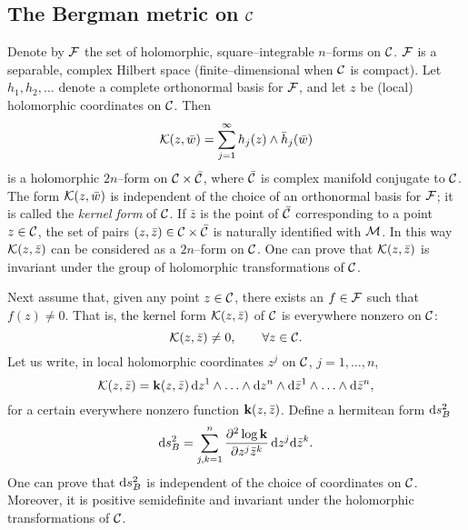 \documentclass[a4paper,a4paper]{article}
\begin{document}
\subsection{The Bergman metric on ${\cal C}$}\label{bemet}


Denote by ${\cal F}$ the set of holomorphic, square--integrable $n$--forms on ${\cal C}$.
${\cal F}$ is a separable, complex Hilbert space (finite--dimensional when ${\cal C}$ is compact).
Let $h_1, h_2, \ldots $ denote a complete orthonormal basis for ${\cal F}$, and let $z$ be (local) 
holomorphic coordinates on ${\cal C}$. Then
\begin{equation}
{\cal K}(z, \bar w)=\sum_{j=1}^{\infty}h_j(z)\wedge\bar h_j(\bar w)
\label{kaka}
\end{equation}
is a holomorphic $2n$--form on ${\cal C}\times\bar {\cal C}$, where $\bar {\cal C}$
is complex manifold conjugate to ${\cal C}$. The form ${\cal K}(z,\bar w)$ is 
independent of the choice of an orthonormal basis for ${\cal F}$; it is called 
the {\it kernel form}\/ of ${\cal C}$. If $\bar z$ is the point of $\bar {\cal C}$ 
corresponding to a point $z\in{\cal C}$, the set of pairs $(z,\bar 
z)\in {\cal C}\times \bar {\cal C}$ is naturally identified with ${\cal 
M}$. In this way ${\cal K}(z, \bar z)$ can be considered as a $2n$--form on 
${\cal C}$. One can prove that ${\cal K}(z, \bar z)$ is invariant under the group 
of holomorphic transformations of ${\cal C}$.

Next assume that, given any point $z\in{\cal C}$, there exists an 
$f\in{\cal F}$ such that $f(z)\neq 0$. That is, the kernel form 
${\cal K}(z,\bar z)$ of ${\cal C}$ is everywhere nonzero on ${\cal C}$:
\begin{equation}
{\cal K}(z,\bar z)\neq 0,\qquad \forall z\in{\cal C}.
\label{knz}
\end{equation}
Let us write, in local holomorphic coordinates $z^j$ on ${\cal C}$,  $j=1,\ldots, n$,
\begin{equation}
{\cal K}(z,\bar z)={\bf k}(z, \bar z)\,{\rm d}z^1\wedge\ldots\wedge{\rm d}z^n\wedge{\rm d}\bar 
z^1\wedge\ldots\wedge{\rm d}\bar z^n,
\label{kicco}
\end{equation}
for a certain everywhere nonzero function ${\bf k}(z, \bar z)$. 
Define a hermitean form ${\rm d}s^2_B$
\begin{equation}
{\rm d}s^2_B=\sum_{j,k=1}^n {\partial^2 \log {\bf k}\over \partial z^j \bar z^k}
\,{\rm d}z^j {\rm d}\bar z^k.
\label{bbmmff}
\end{equation}
One can prove that ${\rm d}s^2_B$ is independent of the choice of coordinates 
on ${\cal C}$. Moreover, it is positive semidefinite and invariant under 
the holomorphic transformations of ${\cal C}$.
\end{document}
